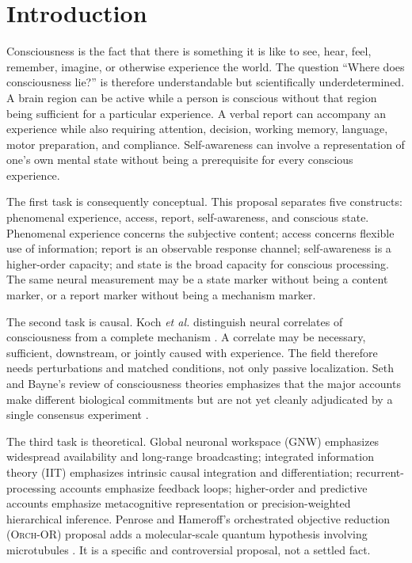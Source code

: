 \documentclass[conference]{IEEEtran}
\newcommand{\GNW}{\textsc{GNW}}
\newcommand{\IIT}{\textsc{IIT}}
\newcommand{\ORCH}{\textsc{Orch-OR}}
\begin{document}
\section{Introduction}

Consciousness is the fact that there is something it is like to see, hear, feel, remember, imagine, or otherwise experience the world. The question ``Where does consciousness lie?'' is therefore understandable but scientifically underdetermined. A brain region can be active while a person is conscious without that region being sufficient for a particular experience. A verbal report can accompany an experience while also requiring attention, decision, working memory, language, motor preparation, and compliance. Self-awareness can involve a representation of one's own mental state without being a prerequisite for every conscious experience.

The first task is consequently conceptual. This proposal separates five constructs: phenomenal experience, access, report, self-awareness, and conscious state. Phenomenal experience concerns the subjective content; access concerns flexible use of information; report is an observable response channel; self-awareness is a higher-order capacity; and state is the broad capacity for conscious processing. The same neural measurement may be a state marker without being a content marker, or a report marker without being a mechanism marker.

The second task is causal. Koch \textit{et al.} distinguish neural correlates of consciousness from a complete mechanism \cite{koch2016}. A correlate may be necessary, sufficient, downstream, or jointly caused with experience. The field therefore needs perturbations and matched conditions, not only passive localization. Seth and Bayne's review of consciousness theories emphasizes that the major accounts make different biological commitments but are not yet cleanly adjudicated by a single consensus experiment \cite{seth2022}.

The third task is theoretical. Global neuronal workspace (\GNW) emphasizes widespread availability and long-range broadcasting; integrated information theory (\IIT) emphasizes intrinsic causal integration and differentiation; recurrent-processing accounts emphasize feedback loops; higher-order and predictive accounts emphasize metacognitive representation or precision-weighted hierarchical inference. Penrose and Hameroff's orchestrated objective reduction (\ORCH) proposal adds a molecular-scale quantum hypothesis involving microtubules \cite{hameroff2014}. It is a specific and controversial proposal, not a settled fact.
\end{document}
